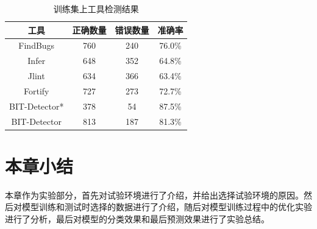 \begin{table}[t]
	\centering
	\caption{训练集上工具检测结果}
	\label{tt}
	\begin{tabular*}{0.9\textwidth}{@{\extracolsep{\fill}}cccc}
		\toprule
		工具	&正确数量&错误数量&准确率	 \\
		\midrule
		FindBugs&760&240&76.0\%\\
		Infer&648&352&64.8\%\\
		Jlint&634&366&63.4\%\\
		Fortify&727&273&72.7\%\\
		BIT-Detector*&378&54&87.5\%\\
		BIT-Detector&813&187&81.3\%\\
		\bottomrule
	\end{tabular*}
\end{table}

\section{本章小结}

本章作为实验部分，首先对试验环境进行了介绍，并给出选择试验环境的原因。然后对模型训练和测试时选择的数据进行了介绍，随后对模型训练过程中的优化实验进行了分析，最后对模型的分类效果和最后预测效果进行了实验总结。